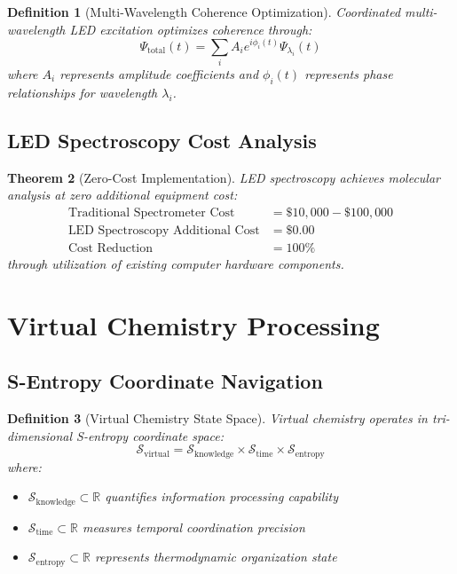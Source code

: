 \documentclass[12pt,a4paper]{article}
\newtheorem{theorem}{Theorem}[section]
\newtheorem{definition}[theorem]{Definition}
\begin{document}
\begin{definition}[Multi-Wavelength Coherence Optimization]
Coordinated multi-wavelength LED excitation optimizes coherence through:
\begin{equation}
\Psi_{\text{total}}(t) = \sum_{i} A_i e^{i\phi_i(t)} \Psi_{\lambda_i}(t)
\end{equation}
where $A_i$ represents amplitude coefficients and $\phi_i(t)$ represents phase relationships for wavelength $\lambda_i$.
\end{definition}

\subsection{LED Spectroscopy Cost Analysis}

\begin{theorem}[Zero-Cost Implementation]
LED spectroscopy achieves molecular analysis at zero additional equipment cost:
\begin{align}
\text{Traditional Spectrometer Cost} &= \$10,000 - \$100,000 \\
\text{LED Spectroscopy Additional Cost} &= \$0.00 \\
\text{Cost Reduction} &= 100\%
\end{align}
through utilization of existing computer hardware components.
\end{theorem}

\section{Virtual Chemistry Processing}

\subsection{S-Entropy Coordinate Navigation}

\begin{definition}[Virtual Chemistry State Space]
Virtual chemistry operates in tri-dimensional S-entropy coordinate space:
\begin{equation}
\mathcal{S}_{\text{virtual}} = \mathcal{S}_{\text{knowledge}} \times \mathcal{S}_{\text{time}} \times \mathcal{S}_{\text{entropy}}
\end{equation}
where:
\begin{itemize}
\item $\mathcal{S}_{\text{knowledge}} \subset \mathbb{R}$ quantifies information processing capability
\item $\mathcal{S}_{\text{time}} \subset \mathbb{R}$ measures temporal coordination precision
\item $\mathcal{S}_{\text{entropy}} \subset \mathbb{R}$ represents thermodynamic organization state
\end{itemize}
\end{definition}
\end{document}
